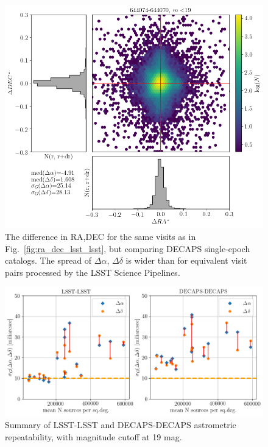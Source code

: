 \documentclass[DM,lsstdraft,toc,usenatbib]{lsstdoc}
\begin{document}
\begin{figure}
\begin{centering}
\includegraphics[width=0.8\columnwidth]{figs/decaps644074-644070_RA_DEC_offset_lims.png}
\caption{The difference in RA,DEC for  the same visits as in Fig.~\ref{fig:ra_dec_lsst_lsst}, but comparing DECAPS single-epoch catalogs. The spread of  $\Delta \alpha$, $\Delta \delta$ is wider than for equivalent visit pairs processed by the LSST Science Pipelines. }
\label{fig:ra_dec_decaps_decaps}
\end{centering}
\end{figure} 




\begin{figure}
\begin{centering}
\includegraphics[width=0.8\columnwidth]{figs/Astrometry_LSST-LSST_DECAPS-DECAPS.png}
\caption{Summary of LSST-LSST and DECAPS-DECAPS astrometric repeatability, with magnitude cutoff at 19 mag.}
\label{fig:ra_dec_summary}
\end{centering}
\end{figure} 
\end{document}
